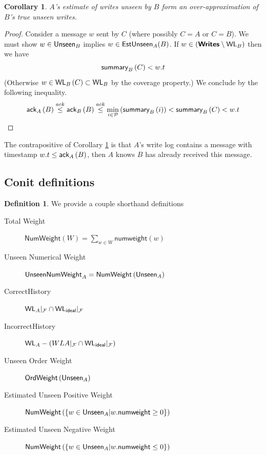 \documentclass[]             %
{NASA}                       %
\newtheorem{corollary}[theorem]{Corollary}
\theoremstyle{definition}
\newtheorem{definition}[theorem]{Definition}
\begin{document}
\begin{corollary}
  \label{cor:unseenest}
  $A$'s estimate of writes unseen by $B$ form an over-approximation of $B$'s true unseen writes.
\end{corollary}
\begin{proof}
  Consider a message $w$ sent by $C$ (where possibly $C = A$ or $C = B$). We must show
  $w \in \textsf{Unseen}_{B}$ implies $w \in \textsf{EstUnseen}_{A}{\left(B\right)}$.  If $w \in \left(\textbf{\textsf{Writes}} \setminus \textsf{WL}_{B}\right)$ then we have
  \[ \textsf{summary}_{B}\left(C\right) < w.t\]
  (Otherwise $w \in \textsf{WL}_{B}\left(C\right) \subset \textsf{WL}_{B}$ by the coverage property.)
  We conclude by the following inequality.
  \[\textsf{ack}_{A}\left(B\right) \overset{ack}{\leq} \textsf{ack}_{B}\left(B\right) \overset{ack}{\leq} \min_{i \in \mathcal{P}} \left(\textsf{summary}_{B}\left(i\right)\right) < \textsf{summary}_{B}\left(C\right) < w.t\]
\end{proof}

The contrapositive of Corollary \ref{cor:unseenest} is that $A$'s
write log contains a message with timestamp $w.t \leq \textsf{ack}_{A}\left(B\right)$,
then $A$ knows $B$ has already received this message.

\subsection{Conit definitions}


\newcommand{\UnseenWeight}[1]{\textsf{Unseen}_{#1}}
\newcommand{\UnseenWeightEst}[2]{\textsf{EstUnseen}_{#1}{\left(#2\right)}}


\begin{definition}
  We provide a couple shorthand definitions
\begin{description}
  \item[Total Weight] $\textsf{NumWeight}(W) = \sum_{w \in W} \textsf{numweight}{\left(w\right)}$
  \item[Unseen Numerical Weight] $\textsf{UnseenNumWeight}_{A} = \textsf{NumWeight}\left(\textsf{Unseen}_{A}\right)$
  \item[CorrectHistory] $\textsf{WL}_{A}|_{\mathcal{F}} \cap \textsf{WL}_{\mathsf{ideal}}|_{\mathcal{F}}$
  \item[IncorrectHistory] $\textsf{WL}_{A} - \left(WL{A}|_{\mathcal{F}} \cap \textsf{WL}_{\mathsf{ideal}}|_{\mathcal{F}}\right)$
  \item[Unseen Order Weight] $\textsf{OrdWeight}\left(\textsf{Unseen}_{A}\right)$
  \item[Estimated Unseen Positive Weight] $\textsf{NumWeight}\left(\{w \in \textsf{Unseen}_{A} | w.\textsf{numweight} \geq 0 \}\right)$
  \item[Estimated Unseen Negative Weight] $\textsf{NumWeight}\left(\{w \in \textsf{Unseen}_{A} | w.\textsf{numweight} \leq 0 \}\right)$
  \end{description}
\end{definition}
\end{document}

